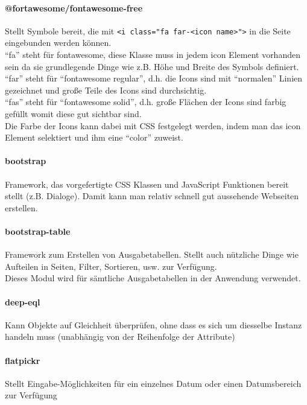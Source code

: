 \documentclass[12pt,pdftex,parskip=half]{scrartcl}
\begin{document}
            \paragraph{@fortawesome/fontawesome-free}
            Stellt Symbole bereit, die mit \lstinline{<i class="fa far-<icon name>">} in die Seite eingebunden werden können.\\
            "`fa"' steht für fontawesome, diese Klasse muss in jedem icon Element vorhanden sein da sie grundlegende Dinge wie z.B. Höhe und Breite des Symbols definiert.\\
            "`far"' steht für "`fontawesome regular"', d.h. die Icons sind mit "`normalen"' Linien gezeichnet und große Teile des Icons sind durchsichtig.\\
            "`fas"' steht für "`fontawesome solid"', d.h. große Flächen der Icons sind farbig gefüllt womit diese gut sichtbar sind.\\
            Die Farbe der Icons kann dabei mit CSS festgelegt werden, indem man das icon Element selektiert und ihm eine ``color'' zuweist.

            \paragraph{bootstrap}
            Framework, das vorgefertigte CSS Klassen und JavaScript Funktionen bereit stellt (z.B. Dialoge). Damit kann man relativ schnell gut aussehende Webseiten erstellen.

            \paragraph{bootstrap-table}
            Framework zum Erstellen von Ausgabetabellen. Stellt auch nützliche Dinge wie Aufteilen in Seiten, Filter, Sortieren, usw. zur Verfügung.\\
            Dieses Modul wird für sämtliche Ausgabetabellen in der Anwendung verwendet.

            \paragraph{deep-eql}
            Kann Objekte auf Gleichheit überprüfen, ohne dass es sich um diesselbe Instanz handeln muss (unabhängig von der Reihenfolge der Attribute)

            \paragraph{flatpickr}
            Stellt Eingabe-Möglichkeiten für ein einzelnes Datum oder einen Datumsbereich zur Verfügung
\end{document}
